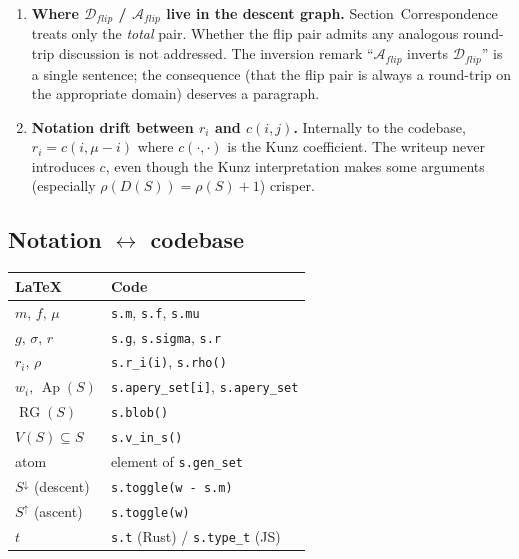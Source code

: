 \documentclass[11pt, a4paper]{article}
\begin{document}
\begin{enumerate}
    \item \textbf{Where $\mathcal{D}_{flip}$ / $\mathcal{A}_{flip}$
    live in the descent graph.} Section~Correspondence treats only
    the \emph{total} pair. Whether the flip pair admits any
    analogous round-trip discussion is not addressed. The
    inversion remark ``$\mathcal{A}_{flip}$ inverts
    $\mathcal{D}_{flip}$'' is a single sentence; the consequence
    (that the flip pair is always a round-trip on the appropriate
    domain) deserves a paragraph.

    \item \textbf{Notation drift between $r_i$ and $c(i,j)$.}
    Internally to the codebase, $r_i = c(i, \mu - i)$ where
    $c(\cdot,\cdot)$ is the Kunz coefficient. The writeup never
    introduces $c$, even though the Kunz interpretation makes some
    arguments (especially $\rho(D(S)) = \rho(S) + 1$) crisper.
\end{enumerate}

\subsection*{Notation $\leftrightarrow$ codebase}

\begin{center}
	\begin{tabular}{l|l}
		LaTeX & Code \\\hline
		$m,\,f,\,\mu$           & \verb|s.m|, \verb|s.f|, \verb|s.mu| \\
		$g,\,\sigma,\,r$        & \verb|s.g|, \verb|s.sigma|, \verb|s.r| \\
		$r_i,\,\rho$            & \verb|s.r_i(i)|, \verb|s.rho()| \\
		$w_i,\,\operatorname{Ap}(S)$ & \verb|s.apery_set[i]|, \verb|s.apery_set| \\
		$\operatorname{RG}(S)$  & \verb|s.blob()| \\
		$V(S) \subseteq S$      & \verb|s.v_in_s()| \\
		atom                    & element of \verb|s.gen_set| \\
		$S^\downarrow$ (descent) & \verb|s.toggle(w - s.m)| \\
		$S^\uparrow$ (ascent)    & \verb|s.toggle(w)| \\
		$t$                     & \verb|s.t| (Rust) / \verb|s.type_t| (JS)
	\end{tabular}
\end{center}
\end{document}
